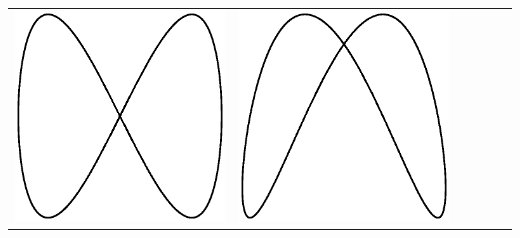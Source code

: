 \begin{center}
\begin{tabular}{c|ccccc}
\includegraphics[scale=0.2]{05_Oscilloscope/2-3.eps} &
\includegraphics[scale=0.2]{05_Oscilloscope/2-4.eps} &

\end{tabular}
\end{center}
